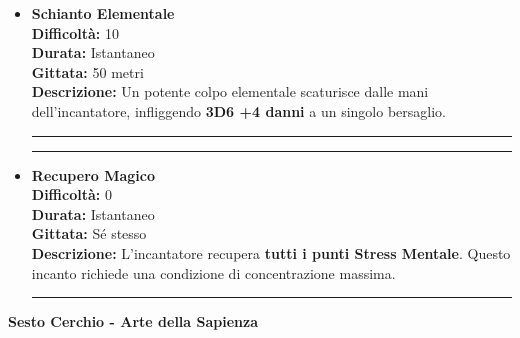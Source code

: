 \documentclass[./magie.tex]{subfiles}
\begin{document}
\begin{itemize}
\item \textbf{Schianto Elementale} \\
\textbf{Difficoltà:} 10 \\
\textbf{Durata:} Istantaneo \\
\textbf{Gittata:} 50 metri \\
\textbf{Descrizione:} Un potente colpo elementale scaturisce dalle mani dell'incantatore, infliggendo \textbf{3D6 +4 danni} a un singolo bersaglio.

\vspace{0.2cm}\rule{\textwidth}{0.4pt}\vspace{1cm}\vspace{0.2cm}
\noindent
\begin{center}
\rule{\textwidth}{0.4pt} 
\end{center}
\vspace{0.2cm}

\item \textbf{Recupero Magico} \\
\textbf{Difficoltà:} 0 \\
\textbf{Durata:} Istantaneo \\
\textbf{Gittata:} Sé stesso \\
\textbf{Descrizione:} L'incantatore recupera \textbf{tutti i punti Stress Mentale}. Questo incanto richiede una condizione di concentrazione massima.

\vspace{0.2cm}
\noindent
\begin{center}
\rule{\textwidth}{0.4pt} 
\end{center}
\vspace{0.2cm}

\end{itemize}

\clearpage
\vspace{0.2cm}
{\zarafirtitlefont\Large\bfseries Sesto Cerchio - Arte della Sapienza}
\end{document}
